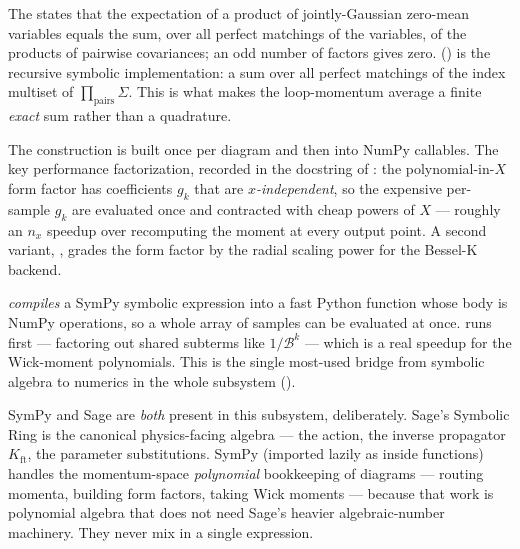 \begin{defn}
The  states that the expectation of a product of
jointly-Gaussian zero-mean variables equals the sum, over all perfect matchings
of the variables, of the products of pairwise covariances; an odd number of
factors gives zero.  ()
is the recursive symbolic implementation: a sum over all perfect matchings of the
index multiset of $\prod_{\text{pairs}}\Sigma$. This is what makes the
loop-momentum average a finite \emph{exact} sum rather than a quadrature.
\end{defn}

The construction is built once per diagram and then  into NumPy
callables. The key performance factorization, recorded in the docstring of
: the polynomial-in-$X$ form factor has coefficients $g_{k}$ that
are \emph{$x$-independent}, so the expensive per-sample $g_{k}$ are evaluated once
and contracted with cheap powers of $X$ --- roughly an $n_{x}$ speedup over
recomputing the moment at every output point. A second variant,
, grades the form factor by the radial scaling power for the
Bessel-K backend.

\begin{defn}
 \emph{compiles} a SymPy
symbolic expression into a fast Python function whose body is NumPy operations,
so a whole array of samples can be evaluated at once.  runs
 first --- factoring out shared subterms
like $1/\mathcal{B}^{k}$ --- which is a real speedup for the Wick-moment
polynomials. This is the single most-used bridge from symbolic algebra to
numerics in the whole subsystem ().
\end{defn}

\begin{note}
SymPy and Sage are \emph{both} present in this subsystem, deliberately. Sage's
Symbolic Ring  is the canonical physics-facing algebra --- the action,
the inverse propagator $K_{\mathrm{ft}}$, the parameter substitutions. SymPy
(imported lazily as  inside functions) handles the
momentum-space \emph{polynomial} bookkeeping of diagrams --- routing momenta,
building form factors, taking Wick moments --- because that work is polynomial
algebra that does not need Sage's heavier algebraic-number machinery. They never
mix in a single expression.
\end{note}

